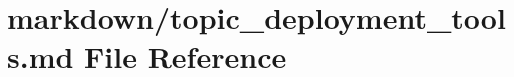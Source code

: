\hypertarget{topic__deployment__tools_8md}{}\section{markdown/topic\+\_\+deployment\+\_\+tools.md File Reference}
\label{topic__deployment__tools_8md}
